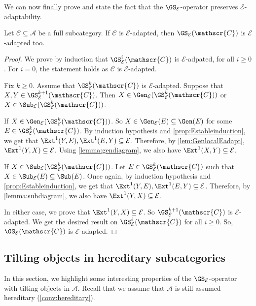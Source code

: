 We can now finally prove and state the fact that the $\GS_\mathcal{E}$-operator preserves $\mathcal{E}$-adaptability.

\begin{prop}
\label{prop:EAdapt}
Let $\mathscr{C} \subseteq \mathscr{A}$ be a full subcategory. If $\mathscr{C}$ is $\mathcal{E}$-adapted, then $\GS_{\mathcal{E}}(\mathscr{C})$ is $\mathcal{E}$-adapted too.
\end{prop}

\begin{proof}
We prove by induction that $\GS^{i}_{\mathcal{E}}(\mathscr{C})$ is ${\mathcal{E}}$-adpated, for all $i \geq 0$. For $i=0$, the statement holds as $\mathcal{C}$ is $\mathcal{E}$-adapted.

Fix $k \geqslant 0$. Assume that  $\GS^{k}_{\mathcal{E}}(\mathscr{C})$ is ${\mathcal{E}}$-adapted. Suppose that $X,Y \in \GS^{k+1}_{\mathcal{E}}(\mathscr{C})$. Then $X \in \Gen_{\mathcal{E}}(\GS^{k}_{\mathcal{E}}(\mathscr{C}))$ or $X \in \Sub_{\mathcal{E}}(\GS^{k}_{\mathcal{E}}(\mathscr{C}))$.

If $X \in \Gen_{\mathcal{E}}(\GS^{k}_{\mathcal{E}}(\mathscr{C}))$. So $X \in \Gen_{\mathcal{E}}(E) \subseteq \Gen(E)$ for some $E \in \GS^{k}_{\mathcal{E}}(\mathscr{C})$. By induction hypothesis and \cref{prop:Estableinduction}, we get that $\Ext^1(Y,E),\Ext^1(E,Y) \subseteq \mathcal{E}$. Therefore, by \cref{lem:GenlocalEadapt}, $\Ext^1(Y,X) \subseteq \mathcal{E}$. Using \cref{lemma:gendiagram}, we also have $\Ext^1(X,Y) \subseteq \mathcal{E}$.

If $X \in \Sub_{\mathcal{E}}(\GS^{k}_{\mathcal{E}}(\mathscr{C}))$. Let $E \in \GS^{k}_{\mathcal{E}}(\mathscr{C})$ such that $X \in \Sub_{\mathcal{E}}(E) \subseteq \Sub(E)$. Once again, by induction hypothesis and \cref{prop:Estableinduction}, we get that $\Ext^1(Y,E),\Ext^1(E,Y) \subseteq \mathcal{E}$. Therefore, by \cref{lemma:subdiagram}, we also have $\Ext^1(Y,X) \subseteq \mathcal{E}$.

In either case, we prove that $\Ext^1(Y,X) \subseteq \mathcal{E}$. So $\GS^{k+1}_{\mathcal{E}}(\mathscr{C})$ is $\mathcal{E}$-adapted. We get the desired result on $\GS^{i}_{\mathcal{E}}(\mathscr{C})$ for all $i \geq 0$. So, $\GS_{\mathcal{E}}(\mathscr{C})$ is  $\mathcal{E}$-adapted.
\end{proof}

\subsection{Tilting objects in hereditary subcategories}
\label{ss:Tilting} In this section, we highlight some interesting properties of the $\GS_\mathcal{E}$-operator with tilting objects in $\mathscr{A}$. Recall that we assume that $\mathscr{A}$ is still assumed hereditary (\cref{conv:hereditary}).

